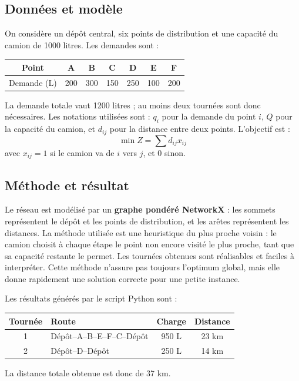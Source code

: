 \documentclass[11pt,a4paper]{article}
\begin{document}
\subsection*{Données et modèle}
On considère un dépôt central, six points de distribution et une capacité du camion de 1000 litres. Les demandes sont :

\begin{center}
\begin{tabular}{ccccccc}
\toprule
Point & A & B & C & D & E & F \\
\midrule
Demande (L) & 200 & 300 & 150 & 250 & 100 & 200 \\
\bottomrule
\end{tabular}
\end{center}

La demande totale vaut 1200 litres ; au moins deux tournées sont donc nécessaires. Les notations utilisées sont : $q_i$ pour la demande du point $i$, $Q$ pour la capacité du camion, et $d_{ij}$ pour la distance entre deux points. L'objectif est :
\[
\min Z = \sum d_{ij}x_{ij}
\]
avec $x_{ij}=1$ si le camion va de $i$ vers $j$, et $0$ sinon.

\subsection*{Méthode et résultat}
Le réseau est modélisé par un \textbf{graphe pondéré NetworkX} : les sommets représentent le dépôt et les points de distribution, et les arêtes représentent les distances. La méthode utilisée est une heuristique du plus proche voisin : le camion choisit à chaque étape le point non encore visité le plus proche, tant que sa capacité restante le permet. Les tournées obtenues sont réalisables et faciles à interpréter. Cette méthode n'assure pas toujours l'optimum global, mais elle donne rapidement une solution correcte pour une petite instance.

Les résultats générés par le script Python sont :
\begin{center}
\begin{tabular}{c p{7.8cm} c c}
\toprule
Tournée & Route & Charge & Distance \\
\midrule
1 & Dépôt--A--B--E--F--C--Dépôt & 950 L & 23 km \\
2 & Dépôt--D--Dépôt & 250 L & 14 km \\
\bottomrule
\end{tabular}
\end{center}
La distance totale obtenue est donc de 37 km.
\end{document}

